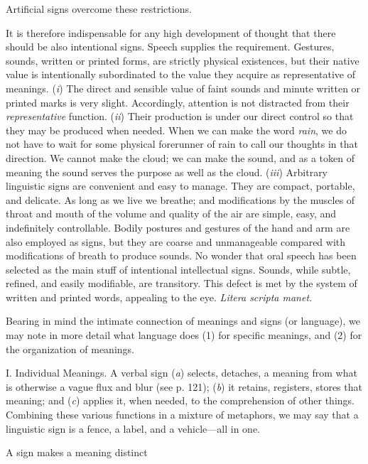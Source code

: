 \documentclass[letterpaper]{book}
\begin{document}
Artificial signs overcome these restrictions.

It is therefore indispensable for any high development of thought that
there should be also intentional signs. Speech supplies the requirement.
Gestures, sounds, written or printed forms, are strictly physical
existences, but their native value is intentionally subordinated to the
value they acquire as representative of meanings. (\emph{i}) The direct
and sensible value of faint sounds and minute written or printed marks
is very slight. Accordingly, attention is not distracted from their
\emph{representative} function. (\emph{ii}) Their production is under
our direct control so that they may be produced when needed. When we can
make the word \emph{rain}, we do not have to wait for some physical
forerunner of rain to call our thoughts in that direction. We cannot
make the cloud; we can make the sound, and as a token of meaning the
sound serves the purpose as well as the cloud. (\emph{iii}) Arbitrary
linguistic signs are convenient and easy to manage. They are compact,
portable, and delicate. As long as we live we breathe; and modifications
by the muscles of throat and mouth of the volume and quality of the air
are simple, easy, and indefinitely controllable. Bodily postures and
gestures of the hand and arm are also employed as signs, but they are
coarse and unmanageable compared with modifications of breath to produce
sounds. No wonder that oral speech has been selected as the main stuff
of intentional intellectual signs. Sounds, while subtle, refined, and
easily modifiable, are transitory. This defect is met by the system of
written
and printed words, appealing to the eye. \emph{Litera scripta manet.}

Bearing in mind the intimate connection of meanings and signs (or
language), we may note in more detail what language does (1) for
specific meanings, and (2) for the organization of meanings.

I. Individual Meanings. A verbal sign (\emph{a}) selects, detaches, a
meaning from what is otherwise a vague flux and blur (see p. 121);
(\emph{b}) it retains, registers, stores that meaning; and (\emph{c})
applies it, when needed, to the comprehension of other things. Combining
these various functions in a mixture of metaphors, we may say that a
linguistic sign is a fence, a label, and a vehicle---all in one.

A sign makes a meaning distinct
\end{document}
